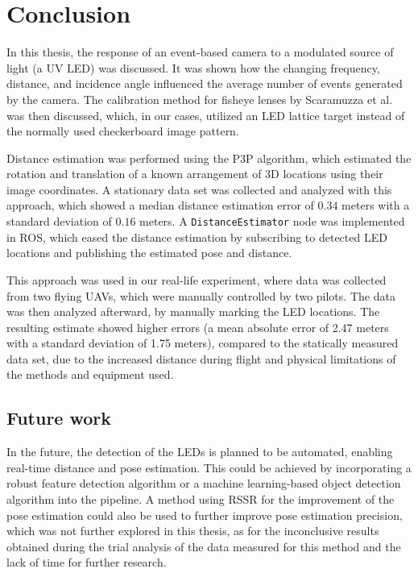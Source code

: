 
\chapter{Conclusion\label{chap:conclusion}}
In this thesis, the response of an event-based camera to a modulated source of light (a \ac{UV} \ac{LED}) was discussed.
It was shown how the changing frequency, distance, and incidence angle influenced the average number of events generated by the camera.
The calibration method for fisheye lenses by Scaramuzza et al.~\cite{scaramuzzacalibration} was then discussed, which, in our cases,
utilized an LED lattice target instead of the normally used checkerboard image pattern.

Distance estimation was performed using the \ac{P3P} algorithm, which estimated the rotation and translation of a known
arrangement of 3D locations using their image coordinates. A stationary data set was collected and analyzed with this
approach, which showed a median distance estimation error of $0.34$ meters with a standard deviation of $0.16$ meters.
A \texttt{DistanceEstimator} node was implemented in \ac{ROS}, which eased the distance estimation by subscribing
to detected \ac{LED} locations and publishing the estimated pose and distance.

This approach was used in our real-life experiment, where data was collected from two flying \ac{UAV}s, which were manually controlled by two pilots.
The data was then analyzed afterward, by manually marking the \ac{LED} locations. The resulting estimate showed
higher errors (a mean absolute error of 2.47 meters with a standard deviation of 1.75 meters), compared to the statically measured data set,
due to the increased distance during flight and physical limitations of the methods and equipment used.

\section{Future work}
In the future, the detection of the \ac{LED}s is planned to be automated, enabling real-time distance and pose estimation.
This could be achieved by incorporating a robust feature detection algorithm or a machine learning-based object detection
algorithm into the pipeline.
A method using \ac{RSSR} for the improvement of the pose estimation could also be used to further improve pose estimation precision,
which was not further explored in this thesis, as for the inconclusive results obtained during the trial analysis of the data measured for this method and the lack of time for further research.